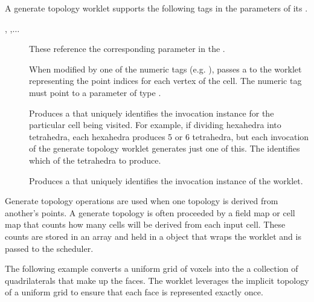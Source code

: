 A generate topology worklet supports the following tags in the parameters
of its \executionsignature.
\begin{description}
\item[, ,$\ldots$] These reference the
  corresponding parameter in the \controlsignature.
\item[] When modified by one of the numeric tags
  (e.g. ), passes a  to the
  worklet representing the point indices for each vertex of the cell. The
  numeric tag must point to a \controlsignature parameter of type
  .
\item[] Produces a  that uniquely identifies the
  invocation instance for the particular cell being visited. For example,
  if dividing hexahedra into tetrahedra, each hexahedra produces 5 or 6
  tetrahedra, but each invocation of the generate topology worklet
  generates just one of this. The  identifies which of the
  tetrahedra to produce.
\item[] Produces a  that uniquely identifies the
  invocation instance of the worklet.
\end{description}

Generate topology operations are used when one topology is derived from
another's points. A generate topology is often proceeded by a field map or
cell map that counts how many cells will be derived from each input
cell. These counts are stored in an array and held in a
 object that wraps the worklet and is passed to
the scheduler. 

The following example converts a uniform grid of voxels into the a
collection of quadrilaterals that make up the faces. The worklet leverages
the implicit topology of a uniform grid to ensure that each face is
represented exactly once.

